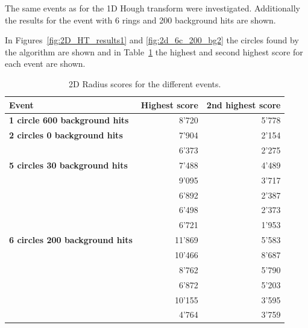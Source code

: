 \documentclass[11pt]{scrreprt}
\begin{document}
The same events as for the 1D
Hough transform were investigated. Additionally the results for the event with 6 rings and 200 background hits are shown.

In Figures~\ref{fig:2D_HT_results1} and \ref{fig:2d_6c_200_bg2} the circles found by the algorithm are shown and in Table~\ref{tab:2d_scores} the highest and second highest score for each event are shown.

\begin{table}[tbp]
  \caption[2D Radius scores for the different events]{2D Radius scores for the different events.}
  \label{tab:2d_scores}
  \centering

  \begin{tabular}{lrr}
  \toprule
  \textbf{Event} & \textbf{Highest score} & \textbf{2nd highest score} \\
  \midrule
  \midrule
  \textbf{1 circle 600 background hits} & 8'720 & 5'778\\
  \midrule
  \textbf{2 circles 0 background hits} & 7'904 & 2'154\\
   & 6'373 & 2'275\\
  \midrule
  \textbf{5 circles 30 background hits} & 7'488 & 4'489\\
  & 9'095 & 3'717\\
  & 6'892 & 2'387\\
  & 6'498 & 2'373\\
  & 6'721 & 1'953\\
  \midrule
  \textbf{6 circles 200 background hits} & 11'869 & 5'583\\
  & 10'466 & 8'687\\
  & 8'762 & 5'790\\
  & 6'872 & 5'203\\
  & 10'155  & 3'595\\
  & 4'764 &  3'759\\
  \bottomrule
  \end{tabular}
\end{table}
\end{document}
